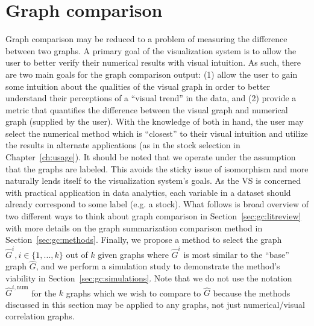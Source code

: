 \chapter{Graph comparison \label{ch:gc}}

Graph comparison may be reduced to a problem of measuring the difference 
between two graphs. 
A primary goal of the visualization system is to allow the user to better 
verify their numerical results with visual intuition. As such, there are two 
main goals for the graph comparison output: (1) allow the user to gain some 
intuition about the qualities of the visual graph in order to better understand 
their perceptions of a ``visual trend'' in the data, and (2) provide a metric 
that quantifies the difference between the visual graph and numerical graph 
(supplied by the user). With the knowledge of both in hand, the user may 
select the numerical method which is 
``closest'' to their visual intuition and utilize the results in alternate 
applications (as in the stock selection in Chapter~\ref{ch:usage}). 
It should be noted that we operate under 
the assumption that the graphs are labeled. This avoids the sticky issue of 
isomorphism and more naturally lends itself to the visualization system's 
goals. As the VS is concerned with practical application in data 
analytics, each variable in a dataset should already correspond to some label 
(e.g. a stock).
What follows is broad overview of two different ways to think about graph 
comparison in Section~\ref{sec:gc:litreview} with more details on the graph 
summarization comparison method in Section~\ref{sec:gc:methods}. Finally, we 
propose a method 
to select the graph $\hat{G}^{i}, i \in \{1,...,k\}$ out of $k$ 
given graphs where $\hat{G}^{i}$ is most similar to the ``base'' 
graph $\hat{G}$, and we perform a simulation study to demonstrate the method's 
viability in Section~\ref{sec:gc:simulations}. Note that we do not use the 
notation $\hat{G}^{i,\text{num}}$ for the $k$ graphs which we wish to compare 
to $\hat{G}$ because the methods discussed in this section may be 
applied to any graphs, not just numerical/visual correlation graphs.



